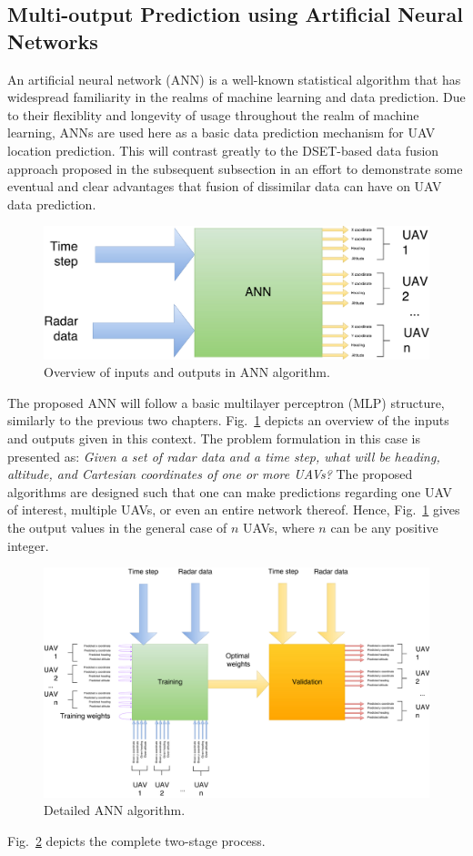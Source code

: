 \documentclass[12pt]{uthesis-v12}  %
\begin{document}
\subsection{Multi-output Prediction using Artificial Neural Networks}
\label{ann}

An artificial neural network (ANN) is a well-known statistical algorithm that has widespread familiarity in the realms of machine learning and data prediction.
Due to their flexiblity and longevity of usage throughout the realm of machine learning, ANNs are used here as a basic data prediction mechanism for UAV location prediction.
This will contrast greatly to the DSET-based data fusion approach proposed in the subsequent subsection in an effort to demonstrate some eventual and clear advantages that fusion of dissimilar data can have on UAV data prediction.

\begin{figure}[!t]
\centering
\includegraphics[width=\textwidth]{io}
\caption{Overview of inputs and outputs in ANN algorithm.}
\label{io}
\end{figure}

The proposed ANN will follow a basic multilayer perceptron (MLP) structure, similarly to the previous two chapters. 
Fig.~\ref{io} depicts an overview of the inputs and outputs given in this context. 
The problem formulation in this case is presented as: \textit{Given a set of radar data and a time step, what will be heading, altitude, and Cartesian coordinates of one or more UAVs?}
The proposed algorithms are designed such that one can make predictions regarding one UAV of interest, multiple UAVs, or even an entire network thereof. 
Hence, Fig.~\ref{io} gives the output values in the general case of $n$ UAVs, where $n$ can be any positive integer.
\begin{figure}[!t]
\centering
\includegraphics[width=5in]{ann}
\caption{Detailed ANN algorithm.}
\label{ann-fig}
\end{figure}
Fig.~\ref{ann-fig} depicts the complete two-stage process.
\end{document}
